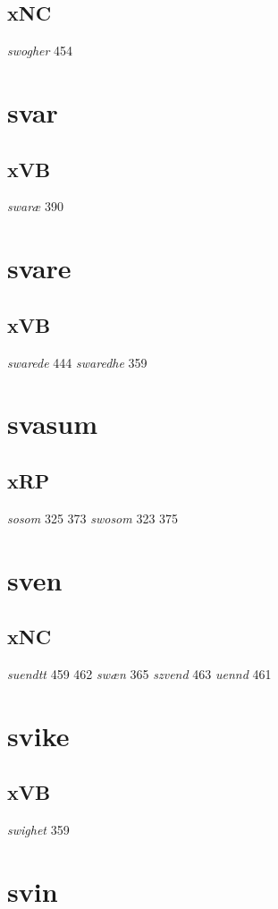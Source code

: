 \documentclass[a4paper,twocolumn]{article}
\begin{document}
\subsection{xNC}
\label{sec:org3d1d9a4}
\emph{swogher} 454 
\section{svar}
\label{sec:org4cdfbe6}
\subsection{xVB}
\label{sec:orgaec065b}
\emph{swaræ} 390 
\section{svare}
\label{sec:org1096841}
\subsection{xVB}
\label{sec:org18f541d}
\emph{swarede} 444 \emph{swaredhe} 359 
\section{svasum}
\label{sec:orgeb639be}
\subsection{xRP}
\label{sec:orgb9141b6}
\emph{sosom} 325 373 \emph{swosom} 323 375 
\section{sven}
\label{sec:org60041df}
\subsection{xNC}
\label{sec:org9e2ada4}
\emph{suendtt} 459 462 \emph{swæn} 365 \emph{szvend} 463 \emph{uennd} 461 
\section{svike}
\label{sec:org869479d}
\subsection{xVB}
\label{sec:orge9cb332}
\emph{swighet} 359 
\section{svin}
\label{sec:org50df897}
\end{document}

